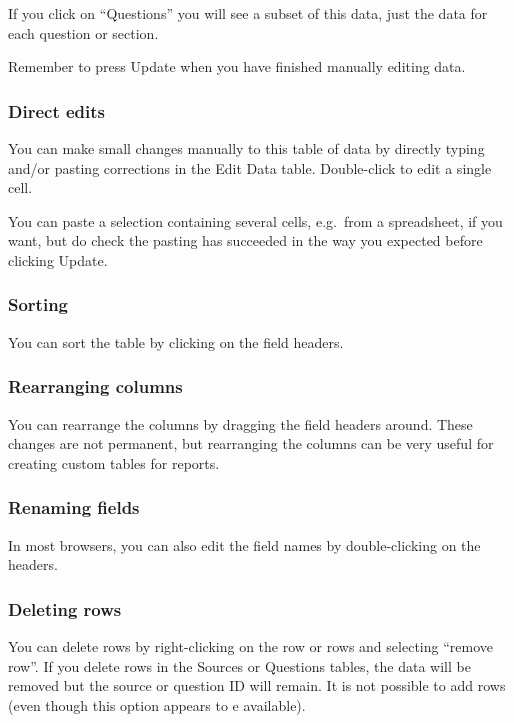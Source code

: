 \documentclass[
]{book}
\begin{document}
If you click on ``Questions'' you will see a subset of this data, just the data for each question or section.

Remember to press Update when you have finished manually editing data.

\hypertarget{direct-edits}{%
\subsubsection{Direct edits}\label{direct-edits}}

You can make small changes manually to this table of data by directly typing and/or pasting corrections in the Edit Data table. Double-click to edit a single cell.

You can paste a selection containing several cells, e.g.~from a spreadsheet, if you want, but do check the pasting has succeeded in the way you expected before clicking Update.

\hypertarget{sorting}{%
\subsubsection{Sorting}\label{sorting}}

You can sort the table by clicking on the field headers.

\hypertarget{rearranging-columns}{%
\subsubsection{Rearranging columns}\label{rearranging-columns}}

You can rearrange the columns by dragging the field headers around. These changes are not permanent, but rearranging the columns can be very useful for creating custom tables for reports.

\hypertarget{renaming-fields}{%
\subsubsection{Renaming fields}\label{renaming-fields}}

In most browsers, you can also edit the field names by double-clicking on the headers.

\hypertarget{deleting-rows}{%
\subsubsection{Deleting rows}\label{deleting-rows}}

You can delete rows by right-clicking on the row or rows and selecting ``remove row''. If you delete rows in the Sources or Questions tables, the data will be removed but the source or question ID will remain. It is not possible to add rows (even though this option appears to e available).
\end{document}
